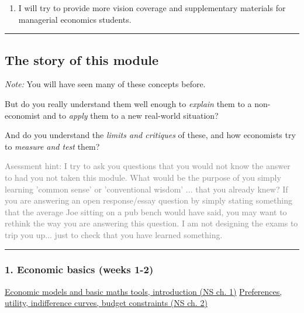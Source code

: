 \documentclass[]{article}
\providecommand{\tightlist}{%
  \setlength{\itemsep}{0pt}\setlength{\parskip}{0pt}}
\begin{document}
\begin{enumerate}
\def\labelenumi{\arabic{enumi}.}
\setcounter{enumi}{5}
\tightlist
\item
  I will try to provide more vision coverage and supplementary materials for managerial economics students.
\end{enumerate}

\begin{center}\rule{0.5\linewidth}{\linethickness}\end{center}

\hypertarget{the-story-of-this-module}{%
\subsection{The story of this module}\label{the-story-of-this-module}}

\emph{Note:} You will have seen many of these concepts before.

But do you really understand them well enough to \emph{explain} them to a non-economist and to \emph{apply} them to a new real-world situation?

And do you understand the \emph{limits and critiques} of these, and how economists try to \emph{measure and test} them?

\textcolor{gray}{Asessment hint: I try to ask you questions that you would not know the answer to had you not taken this module. What would be the purpose of you simply learning 'common sense' or 'conventional wisdom' ... that you already knew? If you are answering an open response/essay question by simply stating something that the average Joe sitting on a pub bench would have said,  you may want to rethink the way you are answering this question. I am not designing the exams to trip you up... just to check that you have learned something.}

\begin{center}\rule{0.5\linewidth}{\linethickness}\end{center}

\hypertarget{economic-basics-weeks-1-2}{%
\subsubsection{1. Economic basics (weeks 1-2)}\label{economic-basics-weeks-1-2}}

\underline{Economic models and basic maths tools, introduction (NS ch. 1)}
\underline{Preferences, utility, indifference curves, budget constraints (NS ch. 2)}
\end{document}
